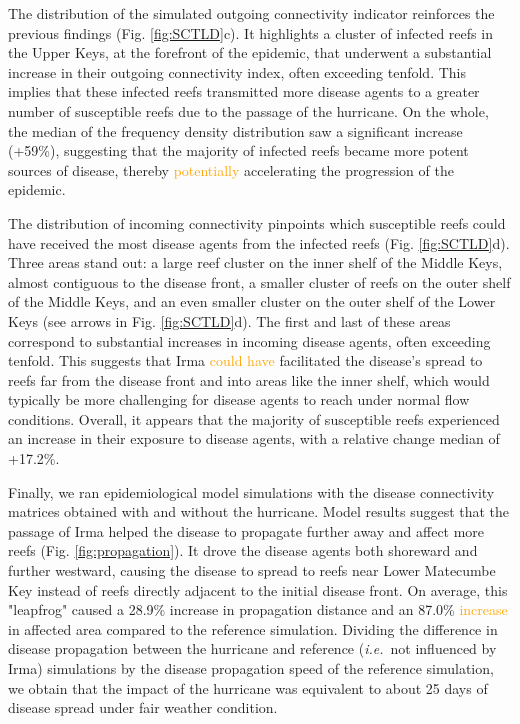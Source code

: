 \documentclass[fleqn,10pt]{wlscirep}
\newcommand{\modif}[1]{\textcolor{orange}{#1}}
\newcommand{\ie}{{\it i.e.}\ }
\begin{document}
The distribution of the simulated outgoing connectivity indicator reinforces the previous findings (Fig. \ref{fig:SCTLD}c). It highlights a cluster of infected reefs in the Upper Keys, at the forefront of the epidemic, that underwent a substantial increase in their outgoing connectivity index, often exceeding tenfold. This implies that these infected reefs transmitted more disease agents to a greater number of susceptible reefs due to the passage of the hurricane. On the whole, the median of the frequency density distribution saw a significant increase (+59\%), suggesting that the majority of infected reefs became more potent sources of disease, thereby \modif{potentially} accelerating the progression of the epidemic.

The distribution of incoming connectivity pinpoints which susceptible reefs could have received the most disease agents from the infected reefs (Fig. \ref{fig:SCTLD}d). Three areas stand out: a large reef cluster on the inner shelf of the Middle Keys, almost contiguous to the disease front, a smaller cluster of reefs on the outer shelf of the Middle Keys, and an even smaller cluster on the outer shelf of the Lower Keys (see arrows in Fig. \ref{fig:SCTLD}d). The first and last of these areas correspond to substantial increases in incoming disease agents, often exceeding tenfold. This suggests that Irma \modif{could have} facilitated the disease's spread to reefs far from the disease front and into areas like the inner shelf, which would typically be more challenging for disease agents to reach under normal flow conditions. Overall, it appears that the majority of susceptible reefs experienced an increase in their exposure to disease agents, with a relative change median of +17.2\%.

Finally, we ran epidemiological model simulations with the disease connectivity matrices obtained with and without the hurricane. Model results suggest that the passage of Irma helped the disease to
propagate further away and affect more reefs (Fig. \ref{fig:propagation}). It drove the disease agents both shoreward and further westward, causing the disease to spread to reefs near Lower Matecumbe Key instead of reefs directly adjacent to the initial disease front. On average, this "leapfrog" caused a 28.9\% increase in propagation distance and an 87.0\% \modif{increase} in affected area compared to the reference simulation. Dividing the difference in disease propagation between the hurricane and reference (\ie not influenced by Irma) simulations by the disease propagation speed of the reference simulation, we obtain that the impact of the hurricane was equivalent to about 25 days of disease spread under fair weather condition.
\end{document}
